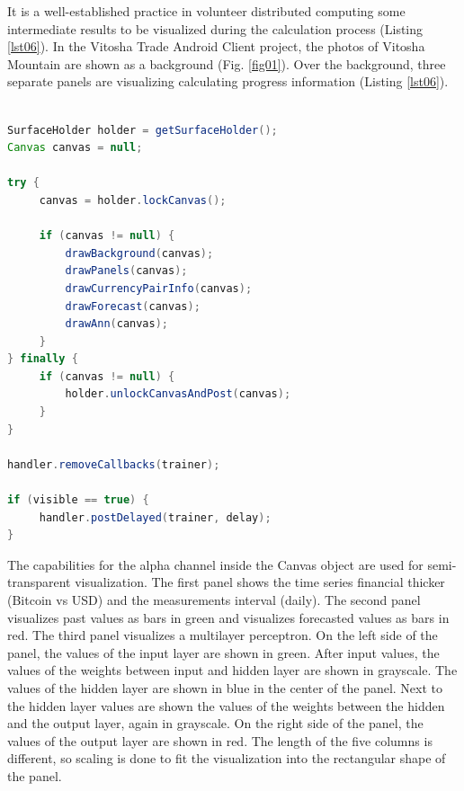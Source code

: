 \documentclass[a4paper,conference]{IEEEtran}
\begin{document}
It is a well-established practice in volunteer distributed computing some intermediate results to be visualized during the calculation process (Listing \ref{lst06}). In the Vitosha Trade Android Client project, the photos of Vitosha Mountain are shown as a background (Fig. \ref{fig01}). Over the background, three separate panels are visualizing calculating progress information (Listing \ref{lst06}).

\begin{lstlisting}[caption=Intermediate results visualization, language=Java, basicstyle=\tiny, label=lst06]

SurfaceHolder holder = getSurfaceHolder();
Canvas canvas = null;

try {
	 canvas = holder.lockCanvas();

	 if (canvas != null) {
	 	 drawBackground(canvas);
	 	 drawPanels(canvas);
	 	 drawCurrencyPairInfo(canvas);
	 	 drawForecast(canvas);
	 	 drawAnn(canvas);
	 }
} finally {
	 if (canvas != null) {
	 	 holder.unlockCanvasAndPost(canvas);
	 }
}

handler.removeCallbacks(trainer);

if (visible == true) {
	 handler.postDelayed(trainer, delay);
}

\end{lstlisting}

The capabilities for the alpha channel inside the Canvas object are used for semi-transparent visualization. The first panel shows the time series financial thicker (Bitcoin vs USD) and the measurements interval (daily). The second panel visualizes past values as bars in green and visualizes forecasted values as bars in red. The third panel visualizes a multilayer perceptron. On the left side of the panel, the values of the input layer are shown in green. After input values, the values of the weights between input and hidden layer are shown in grayscale. The values of the hidden layer are shown in blue in the center of the panel. Next to the hidden layer values are shown the values of the weights between the hidden and the output layer, again in grayscale. On the right side of the panel, the values of the output layer are shown in red. The length of the five columns is different, so scaling is done to fit the visualization into the rectangular shape of the panel. 
\end{document}
